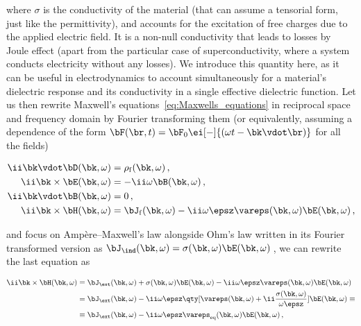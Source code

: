 \noindent where $\sigma$ is the conductivity of the material (that can assume a tensorial form, just like the permittivity), and accounts for the excitation of free charges due to the applied electric field.
It is a non-null conductivity that leads to losses by Joule effect (apart from the particular case of superconductivity, where a system conducts electricity without any losses).
We introduce this quantity here, as it can be useful in electrodynamics to account simultaneously for a material's dielectric response and its conductivity in a single effective dielectric function.
Let us then rewrite Maxwell's equations~\eqref{eq:Maxwells_equations} in reciprocal space and frequency domain by Fourier transforming them (or equivalently, assuming a dependence of the form $\bF(\br,t) = \bF_0 \ei[-]{(\omega t - \bk \vdot \br)}$ for all the fields)

\begin{subequations}
    \begin{align}
        \ii \bk \vdot \bD(\bk,\omega) &= \rho_\f(\bk,\omega) \,,\label{subeq:Gauss_law_reciprocal} \\
        \ii \bk \times \bE(\bk,\omega) &= -\ii \omega \bB(\bk,\omega)\,, \label{subeq:Faradays_law_reciprocal}\\
        \ii \bk \vdot \bB(\bk,\omega) &= 0\, ,\label{subeq:no_magnetic_monopoles_reciprocal}\\
        \ii \bk \times \bH(\bk,\omega) &= \bJ_\f(\bk,\omega) - \ii \omega \epsz \vareps (\bk,\omega) \bE(\bk,\omega)\,, \label{subeq:Amperes_law_reciprocal}
    \end{align}
\end{subequations}

\noindent and focus on Amp\`ere--Maxwell's law alongside Ohm's law written in its Fourier transformed version as $\bJ_\ind(\bk,\omega) = \sigma(\bk,\omega) \bE(\bk,\omega)$\,, we can rewrite the last equation as

\begin{align*}
    \label{subeq:Amperes_law_reciprocal_equivalent}
    \ii \bk \times \bH(\bk,\omega) &= \bJ_\ext(\bk,\omega) + \sigma(\bk,\omega) \bE(\bk,\omega) - \ii \omega \epsz \vareps (\bk,\omega) \bE(\bk,\omega) \\
    &=\bJ_\ext(\bk,\omega) - \ii \omega \epsz \qty[\vareps (\bk,\omega) +\ii \frac{\sigma(\bk,\omega)}{\omega \epsz}] \bE(\bk,\omega) \equiv \\
    &\equiv \bJ_\ext(\bk,\omega)  -\ii \omega \epsz \vareps_{\text{eq}}(\bk,\omega) \bE(\bk,\omega)\,,
\end{align*}


